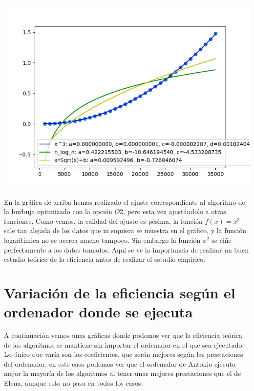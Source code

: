 \documentclass[11pt]{article}
\begin{document}
\begin{center}
\includegraphics[scale=0.7]{../graficos/ordenacion/ajuste_antonio.png}
\end{center}

En la gráfica de arriba hemos realizado el ajuste correspondiente al algoritmo de la burbuja optimizado con la opción $O2$, pero esta vez ajustándolo a otras funciones. Como vemos, la calidad del ajuste es pésima, la función $f(x)=x^3$ sale tan alejada de los datos que ni siquiera se muestra en el gráfico, y la función logarítimica no se acerca mucho tampoco. Sin embargo la función $x^2$ se ciñe perfectamente a los datos tomados. Aquí se ve la importancia de realizar un buen estudio teórico de la eficiencia antes de realizar el estudio empírico.


\section{Variación de la eficiencia según el ordenador donde se ejecuta}

A continuación vemos unas gráficas donde podemos ver que la eficiencia teórica de los algoritmos se mantiene sin importar el ordenador en el que sea ejecutado. Lo único que varía son los coeficientes, que serán mejores según las prestaciones del ordenador, en este caso podemos ver que el ordenador de Antonio ejecuta mejor la mayoría de los algoritmos al tener unas mejores prestaciones que el de Elena, aunque esto no pasa en todos los casos.
\end{document}
